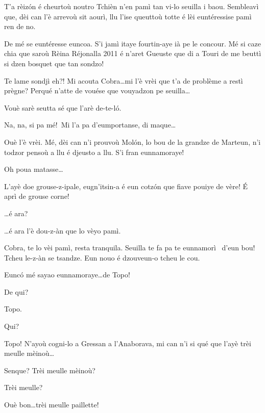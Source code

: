 \begin{drama}
\Tzardounspeaks T’a rèiz\'on é cheurtoù noutro Tchièn n’en pamì tan vi-lo seuilla i baou. Sembleavì que, dèi can l'è arrevoù sit aourì, llu l'ise queuttoù totte é lèi euntéressise pamì ren de no.

\Cobraspeaks De mé se euntéresse euncoa. S’i jamì itaye fourtin-aye ià pe le concour. Mé si caze chia que saroù Rèina Réjonalla 2011 é n’aret Gueuste que di a Touri de me beuttì si dzen bosquet que tan sondzo!

\Tzardounspeaks Te lame sondjì eh?!  Mi acouta Cobra\ldots mi l’è vrèi que t’a de problème a restì prègne? Perqué n’atte de vouése que vouyadzon pe seuilla\ldots


\Cobraspeaks Vouè sarè seutta sé que l’arè de-te-l\'o.

\Piccinaspeaks Na, na, si pa mé!\imbarazzatoo\ Mi l’a pa d'eumportanse, di maque\ldots

\Cobraspeaks Ouè l’è vrèi. Mé, dèi can n’i prouvoù Mol\'on, lo bou de la grandze de Marteun, n’i todzor pensoù a llu é djeusto a llu. S’i fran eunnamoraye!

\Piccinaspeaks Oh poua matasse\ldots

\Cobraspeaks  L’ayè doe grouse-z-ipale, eugn'itsin-a é eun cotz\'on que fiave pouiye de vère! \'E aprì de grouse corne!

\Piccinaspeaks \ldots é ara?

\Cobraspeaks \ldots é ara l’è dou-z-àn que lo vèyo pamì.

\Tzardounspeaks Cobra, te lo vèi pamì, resta tranquila. Seuilla te fa pa te eunnamorì \inamourou\ d’eun bou! Tcheu le-z-àn se tsandze. Eun nouo é dzouveun-o tcheu le cou.

\Piccinaspeaks Eunc\'o mé sayao eunnamoraye\ldots de Topo!

\Tzardounspeaks De qui?

\Piccinaspeaks Topo.

\Tzardounspeaks Qui?

\Piccinaspeaks {} Topo! N’ayoù cogni-lo a Gressan a l’Anaborava, mi can n'i si qué que l’ayè trèi meulle mèinoù\ldots

\Tzardounspeaks Senque? Trèi meulle mèinoù?

\Cobraspeaks Trèi meulle?

\Piccinaspeaks Ouè bon\ldots trèi meulle paillette!


\end{drama}
